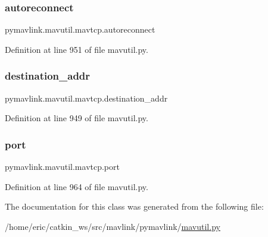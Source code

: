 \subsubsection{\texorpdfstring{autoreconnect}{autoreconnect}}
{\footnotesize\ttfamily pymavlink.\+mavutil.\+mavtcp.\+autoreconnect}



Definition at line 951 of file mavutil.\+py.

\mbox{\label{classpymavlink_1_1mavutil_1_1mavtcp_a7a7efbeb3512d855ba5ed722ab5df2ec}} 
\subsubsection{\texorpdfstring{destination\_addr}{destination\_addr}}
{\footnotesize\ttfamily pymavlink.\+mavutil.\+mavtcp.\+destination\+\_\+addr}



Definition at line 949 of file mavutil.\+py.

\mbox{\label{classpymavlink_1_1mavutil_1_1mavtcp_adb18344f59fadaccd747f90faf0e9aaf}} 
\subsubsection{\texorpdfstring{port}{port}}
{\footnotesize\ttfamily pymavlink.\+mavutil.\+mavtcp.\+port}



Definition at line 964 of file mavutil.\+py.



The documentation for this class was generated from the following file\+:\begin{DoxyCompactItemize}
\item 
/home/eric/catkin\+\_\+ws/src/mavlink/pymavlink/\mbox{\hyperlink{mavutil_8py}{mavutil.\+py}}\end{DoxyCompactItemize}
